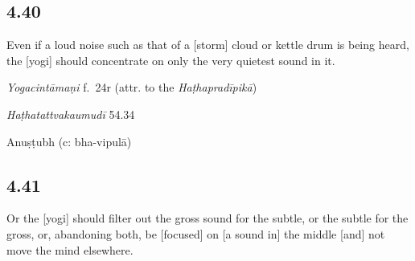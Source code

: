 \begin{ekdosis}

\subsection*{4.40}
\begin{translation}[hp04_040]
Even if a loud noise such as that of a [storm] cloud or kettle drum is being heard, the [yogi] should concentrate on only the very quietest sound in it.
\end{translation}


\begin{testimonia}[hp04_040]
\emph{Yogacintāmaṇi} f.~24r (attr. to the \emph{Haṭhapradīpikā})
\begin{versinnote}
\end{versinnote}

\emph{Haṭhatattvakaumudī} 54.34
\begin{versinnote}
\end{versinnote}
\end{testimonia}


\begin{metre}[hp04_040]
Anuṣṭubh (c: bha-vipulā)
\end{metre}

\subsection*{4.41}
\begin{translation}[hp04_041]
Or the [yogi] should filter out the gross sound for the subtle, or the subtle for the gross, or, abandoning both, be [focused] on [a sound in] the middle [and] not move the mind elsewhere.%
\end{translation} %


\end{ekdosis}
